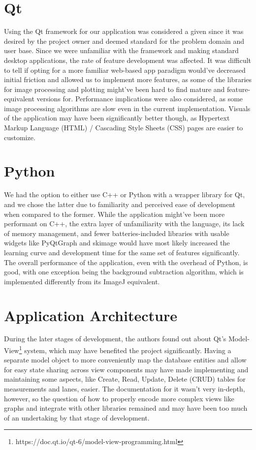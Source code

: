 \section{Qt}
Using the Qt framework for our application was considered a given since it was desired by the project owner and deemed standard for the problem domain and user base. Since we were unfamiliar with the framework and making standard desktop applications, the rate of feature development was affected. It was difficult to tell if opting for a more familiar web-based app paradigm would've decreased initial friction and allowed us to implement more features, as some of the libraries for image processing and plotting might've been hard to find mature and feature-equivalent versions for. Performance implications were also considered, as some image processing algorithms are slow even in the current implementation. Visuals of the application may have been significantly better though, as Hypertext Markup Language (HTML) / Cascading Style Sheets (CSS) pages are easier to customize.

\section{Python}
We had the option to either use C++ or Python with a wrapper library for Qt, and we chose the latter due to familiarity and perceived ease of development when compared to the former. While the application might've been more performant on C++, the extra layer of unfamiliarity with the language, its lack of memory management, and fewer batteries-included libraries with usable widgets like PyQtGraph and skimage would have most likely increased the learning curve and development time for the same set of features significantly. The overall performance of the application, even with the overhead of Python, is good, with one exception being the background subtraction algorithm, which is implemented differently from its ImageJ equivalent.

\section{Application Architecture}
During the later stages of development, the authors found out about Qt's Model-View\footnote{https://doc.qt.io/qt-6/model-view-programming.html} system, which may have benefited the project significantly. Having a separate model object to more conveniently map the database entities and allow for easy state sharing across view components may have made implementing and maintaining some aspects, like Create, Read, Update, Delete (CRUD) tables for measurements and lanes, easier.
The documentation for it wasn't very in-depth, however, so the question of how to properly encode more complex views like graphs and integrate with other libraries remained and may have been too much of an undertaking by that stage of development.

